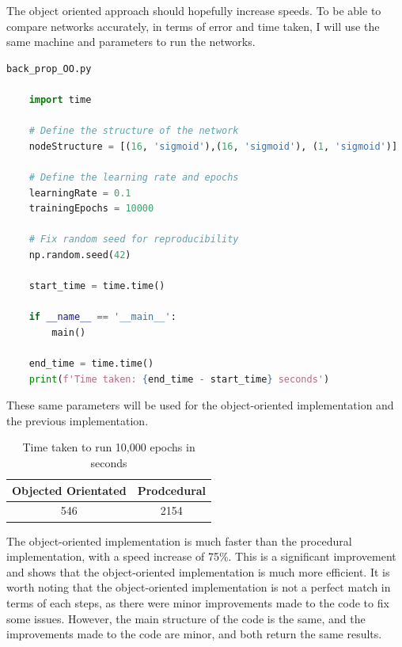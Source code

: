 \documentclass{report}
\begin{document}
The object oriented approach should hopefully increase speeds.
To be able to compare networks accurately, in terms of error and time taken, I will use the same machine and parameters to run the networks.
\begin{lstlisting}[language=Python]
back_prop_OO.py

    import time

    # Define the structure of the network
    nodeStructure = [(16, 'sigmoid'),(16, 'sigmoid'), (1, 'sigmoid')]

    # Define the learning rate and epochs
    learningRate = 0.1
    trainingEpochs = 10000

    # Fix random seed for reproducibility
    np.random.seed(42)

    start_time = time.time()

    if __name__ == '__main__':
        main()

    end_time = time.time()
    print(f'Time taken: {end_time - start_time} seconds')

\end{lstlisting}

These same parameters will be used for the object-oriented implementation and the previous implementation.

\begin{table}[h]
    \centering
    \begin{tabular}{|c|c|}
        \hline
        Objected Orientated & Prodcedural  \\
        \hline
        546 & 2154 \\
        \hline
    \end{tabular}
    \caption{Time taken to run 10,000 epochs in seconds}
    \label{tab:iqr_results}
\end{table}

The object-oriented implementation is much faster than the procedural implementation, with a speed increase of 75\%.
This is a significant improvement and shows that the object-oriented implementation is much more efficient.
\vspace{1em}
\newline
It is worth noting that the object-oriented implementation is not a perfect match in terms of each steps, as there were minor improvements made to the code to fix some issues.
However, the main structure of the code is the same, and the improvements made to the code are minor, and both return the same results.
\end{document}
